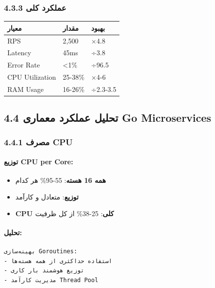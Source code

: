\documentclass[
]{article}
\newcounter{none} %
\providecommand{\tightlist}{%
  \setlength{\itemsep}{0pt}\setlength{\parskip}{0pt}}
\begin{document}
\subsubsection{4.3.3 عملکرد
کلی}\label{ux639ux645ux644ux6a9ux631ux62f-ux6a9ux644ux6cc-1}

{\def\LTcaptype{none} %
\begin{longtable}[]{@{}lll@{}}
\toprule\noalign{}
معیار & مقدار & بهبود \\
\midrule\noalign{}
\endhead
\bottomrule\noalign{}
\endlastfoot
RPS & 2,500 & ×4.8 \\
Latency & 45ms & ÷3.8 \\
Error Rate & \textless1\% & ÷96.5 \\
CPU Utilization & 25-38\% & ×4-6 \\
RAM Usage & 16-26\% & ÷2.3-3.5 \\
\end{longtable}
}

\subsection{4.4 تحلیل عملکرد معماری Go
Microservices}\label{ux62aux62dux644ux6ccux644-ux639ux645ux644ux6a9ux631ux62f-ux645ux639ux645ux627ux631ux6cc-go-microservices}

\subsubsection{4.4.1 مصرف CPU}\label{ux645ux635ux631ux641-cpu-2}

\paragraph{توزیع CPU per
Core:}\label{ux62aux648ux632ux6ccux639-cpu-per-core-2}

\begin{itemize}
\tightlist
\item
  \textbf{همه 16 هسته}: 55-95\% هر کدام
\item
  \textbf{توزیع}: متعادل و کارآمد
\item
  \textbf{CPU کلی}: 25-38\% از کل ظرفیت
\end{itemize}

\paragraph{تحلیل:}\label{ux62aux62dux644ux6ccux644-4}

\begin{verbatim}
بهینه‌سازی Goroutines:
- استفاده حداکثری از همه هسته‌ها
- توزیع هوشمند بار کاری
- مدیریت کارآمد Thread Pool
\end{verbatim}
\end{document}
